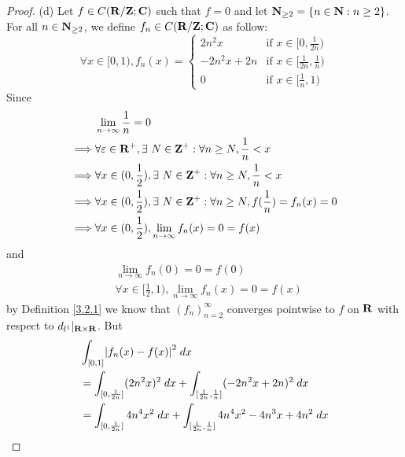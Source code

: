 \begin{proof}{(d)}
    Let \(f \in C(\mathbf{R} / \mathbf{Z} ; \mathbf{C})\) such that \(f = 0\) and let \(\mathbf{N}_{\geq 2} = \{n \in \mathbf{N} : n \geq 2\}\).
    For all \(n \in \mathbf{N}_{\geq 2}\), we define \(f_n \in C(\mathbf{R} / \mathbf{Z} ; \mathbf{C})\) as follow:
    \[
        \forall x \in [0, 1), f_n(x) = \begin{cases}
            2 n^2 x       & \text{if } x \in [0, \frac{1}{2n})           \\
            -2 n^2 x + 2n & \text{if } x \in [\frac{1}{2n}, \frac{1}{n}) \\
            0             & \text{if } x \in [\frac{1}{n}, 1)
        \end{cases}
    \]
    Since
    \begin{align*}
                 & \lim_{n \to \infty} \frac{1}{n} = 0                                                                 \\
        \implies & \forall \varepsilon \in \mathbf{R}^+, \exists\ N \in \mathbf{Z}^+ : \forall n \geq N, \frac{1}{n} < x               \\
        \implies & \forall x \in (0, \frac{1}{2}), \exists\ N \in \mathbf{Z}^+ : \forall n \geq N, \frac{1}{n} < x             \\
        \implies & \forall x \in (0, \frac{1}{2}), \exists\ N \in \mathbf{Z}^+ : \forall n \geq N, f(\frac{1}{n}) = f_n(x) = 0 \\
        \implies & \forall x \in (0, \frac{1}{2}), \lim_{n \to \infty} f_n(x) = 0 = f(x)
    \end{align*}
    and
    \begin{align*}
         & \lim_{n \to \infty} f_n(0) = 0 = f(0)                                 \\
         & \forall x \in [\frac{1}{2}, 1), \lim_{n \to \infty} f_n(x) = 0 = f(x)
    \end{align*}
    by Definition \ref{3.2.1} we know that \((f_n)_{n = 2}^\infty\) converges pointwise to \(f\) on \(\mathbf{R}\) with respect to \(d_{l^1}|_{\mathbf{R} \times \mathbf{R}}\).
    But
    \begin{align*}
         & \int_{[0, 1]} \abs{f_n(x) - f(x)}^2 \; dx                                                                                                              \\
         & = \int_{[0, \frac{1}{2n}]} (2 n^2 x)^2 \; dx + \int_{[\frac{1}{2n}, \frac{1}{n}]} (-2n^2 x + 2n)^2 \; dx                                               \\
         & = \int_{[0, \frac{1}{2n}]} 4 n^4 x^2 \; dx + \int_{[\frac{1}{2n}, \frac{1}{n}]} 4 n^4 x^2 - 4 n^3 x + 4n^2 \; dx                                       \\

\end{align*}
\end{proof}
